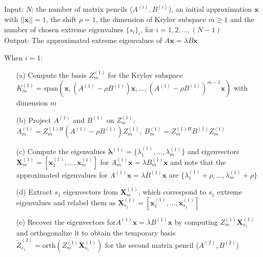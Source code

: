 \begin{algorithm}[H]
    \SetAlgoLined
    Input: $N$: the number of matrix pencils ($A^{(i)}, B^{(i)}$), an initial approximation $\boldsymbol{x}$ with $||\boldsymbol{x}|| = 1$, the shift $\rho = 1$, the dimension of Krylov subspace $m\geq 1$ and the number of chosen extreme eigenvalues $\{s_{i}\}_{i}$, for $i = 1, 2, \dots, (N-1)$\\
    Output: The approximated extreme eigenvalues of $A\boldsymbol{x} = \lambda B\boldsymbol{x}$\\

    \begin{algorithmic}[1]
        \STATE When $i = 1$:
        \begin{itemize}
            \item[(a)] Compute the basis $Z_{m}^{(1)}$ for the Krylov subspace $K_{m}^{(1)} = \text{span}\left(\boldsymbol{x}, (A^{(1)} - \rho B^{(1)})\boldsymbol{x}, \dots, (A^{(1)} - \rho B^{(1)})^{m-1}\boldsymbol{x}\right)$ with dimension $m$
            
            \item[(b)] Project $A^{(1)}$ and $B^{(1)}$ on $Z_{m}^{(1)}$: 
            $A_{m}^{(1)} = Z_{m}^{(1)H}(A^{(1)} - \rho B^{(1)})Z_{m}^{(1)},\  B_{m}^{(1)} = Z_{m}^{(1)H}B^{(1)}Z_{m}^{(1)}$

    
            \item[(c)] Compute the eigenvalues $\boldsymbol{\lambda}^{(1)} = \{\lambda_{1}^{(1)}, \dots, \lambda_{m}^{(1)}\}$ and eigenvectors $\boldsymbol{X}_{m}^{(1)} = \left[\boldsymbol{x}_{1}^{(1)}, \dots, \boldsymbol{x}_{m}^{(1)}\right]$ for $A_{m}^{(1)}\boldsymbol{x} = \lambda B_{m}^{(1)}\boldsymbol{x}$ and note that the approximated eigenvalues for $A^{(1)}\boldsymbol{x} = \lambda B^{(1)}\boldsymbol{x}$ are $\{\lambda_{1}^{(1)}+\rho, \dots, \lambda_{m}^{(1)}+\rho\}$
            
            \item[(d)] Extract $s_{1}$ eigenvectors from $\boldsymbol{X}_{m}^{(1)}$, which correspond to $s_{1}$ extreme eigenvalues and relabel them as $\boldsymbol{X}_{s_{1}}^{(1)} = \left[\boldsymbol{x}_{1}^{(1)}, \dots, \boldsymbol{x}_{s_{1}}^{(1)}\right]$
            
            \item[(e)] Recover the eigenvectors for$A^{(1)}\boldsymbol{x} = \lambda B^{(1)}\boldsymbol{x}$ by computing $Z_{m}^{(1)}\boldsymbol{X}_{s_{1}}^{(1)}$ and orthogonalize it to obtain the temporary basis $\tilde{Z}_{s_{1}}^{(2)} = \text{orth}\left(Z_{m}^{(1)}\boldsymbol{X}_{s_{1}}^{(1)}\right)$ for the second matrix pencil ($A^{(2)}, B^{(2)}$)
        \end{itemize}
        

\end{algorithmic}
\end{algorithm}
